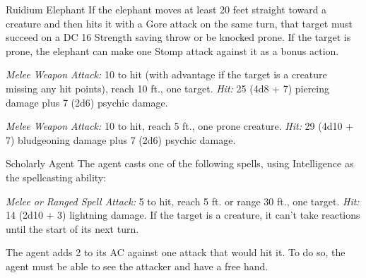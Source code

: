 \documentclass[10pt,a4paper,twoside,bg=print,twocolumn,openany,nodeprecatedcode]{dndbook}
\begin{document}
\begin{DndMonster}[float=t]{Ruidium Elephant}
\DndMonsterBasics[
armor-class = {16 (natural armor)},
hit-points = {\DndDice{12d12 + 60}},
speed = {40 ft.}
]
\DndMonsterAbilityScores[
 str = 24,
 dex = 9,
 con = 21,
 int = 3,
 wis = 11,
 cha = 6
]
\DndMonsterDetails[
condition-immunities = {charmed, frightened},
challenge = 8,
]
If the elephant moves at least 20 feet straight toward a creature and then hits it with a Gore attack on the same turn, that target must succeed on a DC 16 Strength saving throw or be knocked prone. If the target is prone, the elephant can make one Stomp attack against it as a bonus action.

\textsl{Melee Weapon Attack:} 10 to hit (with advantage if the target is a creature missing any hit points), reach 10 ft., one target. \textsl{Hit:} 25 (4d8 + 7) piercing damage plus 7 (2d6) psychic damage.

\textsl{Melee Weapon Attack:} 10 to hit, reach 5 ft., one prone creature. \textsl{Hit:} 29 (4d10 + 7) bludgeoning damage plus 7 (2d6) psychic damage.

\end{DndMonster}



\begin{DndMonster}[float=t]{Scholarly Agent}
\DndMonsterBasics[
armor-class = {11},
hit-points = {\DndDice{4d8 + 4}},
speed = {30 ft.}
]
\DndMonsterAbilityScores[
 str = 10,
 dex = 12,
 con = 12,
 int = 16,
 wis = 12,
 cha = 10
]
\DndMonsterDetails[
saving-throws = {Int +5},
skills = {Arcana +5, History +5, Investigation +5},
languages = {Common plus one other language},
challenge = 1,
]
The agent casts one of the following spells, using Intelligence as the spellcasting ability:
\begin{DndMonsterSpells}
\end{DndMonsterSpells}
\textsl{Melee or Ranged Spell Attack:} 5 to hit, reach 5 ft. or range 30 ft., one target. \textsl{Hit:} 14 (2d10 + 3) lightning damage. If the target is a creature, it can't take reactions until the start of its next turn.

The agent adds 2 to its AC against one attack that would hit it. To do so, the agent must be able to see the attacker and have a free hand.

\end{DndMonster}
\end{document}
